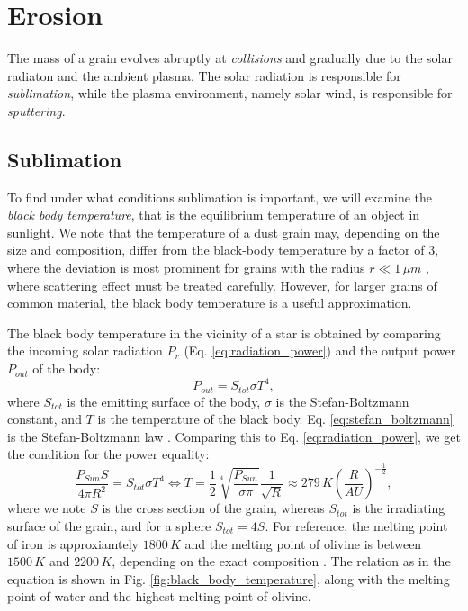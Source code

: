 \section{Erosion} \label{ch:erosion}

The mass of a grain evolves abruptly at \textit{collisions} and gradually due to the solar radiaton and the ambient plasma. The solar radiation is responsible for \textit{sublimation}, while the plasma environment, namely solar wind, is responsible for \textit{sputtering}. 

\subsection{Sublimation}

To find under what conditions sublimation is important, we will examine the \textit{black body temperature}, that is the equilibrium temperature of an object in sunlight. We note that the temperature of a dust grain may, depending on the size and composition, differ from the black-body temperature by a factor of $3$, where the deviation is most prominent for grains with the radius $r \ll 1 \, \si{\mu m}$ \citep{myrvang2018temperature}, where scattering effect must be treated carefully. However, for larger grains of common material, the black body temperature is a useful approximation. 

The black body temperature in the vicinity of a star is obtained by comparing the incoming solar radiation $P_{r}$ (Eq. \ref{eq:radiation_power}) and the output power $P_{out}$ of the body:
\begin{equation}
    P_{out} = S_{tot} \sigma T^4,
    \label{eq:stefan_boltzmann}
\end{equation}
where $S_{tot}$ is the emitting surface of the body, $\sigma$ is the Stefan-Boltzmann constant, and $T$ is the temperature of the black body. Eq. \ref{eq:stefan_boltzmann} is the Stefan-Boltzmann law \citep{stefan1879uber,boltzmann1884ableitnung}. Comparing this to Eq. \ref{eq:radiation_power}, we get the condition for the power equality:
\begin{equation}
    \frac{P_{Sun} S}{4 \pi R^2} = S_{tot} \sigma T^4 \Leftrightarrow T =  \frac{1}{2} \sqrt[4]{\frac{P_{Sun}}{\sigma \pi}} \frac{1}{\sqrt{R}} \approx 279 \, \si{K} \left(\frac{R}{\si{AU}}\right)^{-\frac{1}{2}}, 
\end{equation}
where we note $S$ is the cross section of the grain, whereas $S_{tot}$ is the irradiating surface of the grain, and for a sphere $S_{tot} = 4S$. For reference, the melting point of iron is approxiamtely $1800 \, \si{K}$ and the melting point of olivine is between $1500 \, \si{K}$ and $2200 \, \si{K}$, depending on the exact composition \citep{liu1975melting,pinti2015olivine}. The relation as in the equation is shown in Fig. \ref{fig:black_body_temperature}, along with the melting point of water and the highest melting point of olivine.

